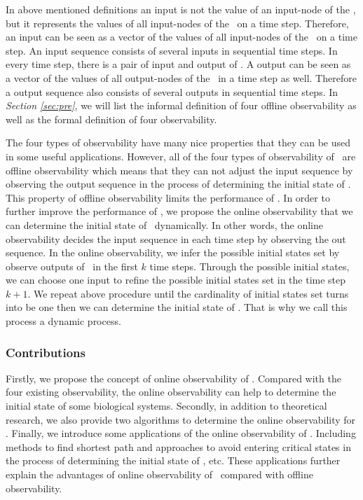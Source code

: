 
In above mentioned definitions an input is not the value of an input-node of the \BCN, but it represents the values of all input-nodes of the \BCN\ on a time step. Therefore, an input can be seen as a vector of the values of all input-nodes of the \BCN\ on a time step. An input sequence consists of several inputs in sequential time steps. In every time step, there is a pair of input and output of \BCN.
     A output can be seen as a vector of the values of all output-nodes of the \BCN\ in a time step as well. Therefore a output sequence also consists of several outputs in sequential time steps. In {\em Section \ref{sec:pre}}, we will list the informal definition of four offline  observability as well as the formal definition of four observability.%


The four  types of observability  have many nice properties that they can be used in some useful applications. However, all of the four types of observability of \BCNs\ are offline observability which means that they can not adjust the input sequence by observing the output sequence in the process of determining the initial state of \BCNs. This property of offline observability limits the performance of \BCNs. In order to further improve the performance of \BCNs, we propose the online observability that we can determine the initial state of \BCNs\ dynamically. In other words,  the online observability decides the input sequence in each time step by observing the out sequence. In the  online observability, we infer the possible  initial states set by observe outputs of \BCN\ in the first $k$ time steps. Through the  possible  initial states, we can choose one input to refine the possible initial states set in the time step $k+1$. We repeat above procedure until the cardinality of initial states set turns into be one then we can determine the initial state of \BCNs. That is why we call this process a dynamic process. 

\subsubsection*{Contributions}
Firstly, we propose the concept of online observability of \BCNs. Compared with the four existing observability, the online observability can help to determine the initial state of some biological systems. Secondly, in addition to theoretical research, we also provide two algorithms to determine the online observability for \BCNs. Finally, we introduce some applications of the online observability of \BCNs. Including methods to find shortest path and approaches to avoid entering critical states in the process of determining the initial state of \BCNs, etc.  These applications further explain the advantages of online observability of \BCNs\ compared with offline observability. %
